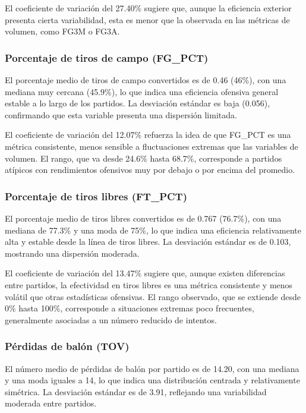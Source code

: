 \documentclass[12pt]{article}
\begin{document}
El coeficiente de variación del 27.40\% sugiere que, aunque la eficiencia exterior presenta cierta
variabilidad, esta es menor que la observada en las métricas de volumen, como FG3M o FG3A.

\subsubsection*{Porcentaje de tiros de campo (FG\_PCT)}

El porcentaje medio de tiros de campo convertidos es de 0.46 (46\%), con una mediana muy cercana
(45.9\%), lo que indica una eficiencia ofensiva general estable a lo largo de los partidos. La
desviación estándar es baja (0.056), confirmando que esta variable presenta una dispersión limitada.

El coeficiente de variación del 12.07\% refuerza la idea de que FG\_PCT es una métrica consistente,
menos sensible a fluctuaciones extremas que las variables de volumen. El rango, que va desde
24.6\% hasta 68.7\%, corresponde a partidos atípicos con rendimientos ofensivos muy por debajo o
por encima del promedio.

\subsubsection*{Porcentaje de tiros libres (FT\_PCT)}

El porcentaje medio de tiros libres convertidos es de 0.767 (76.7\%), con una mediana de 77.3\% y
una moda de 75\%, lo que indica una eficiencia relativamente alta y estable desde la línea de
tiros libres. La desviación estándar es de 0.103, mostrando una dispersión moderada.

El coeficiente de variación del 13.47\% sugiere que, aunque existen diferencias entre partidos,
la efectividad en tiros libres es una métrica consistente y menos volátil que otras estadísticas
ofensivas. El rango observado, que se extiende desde 0\% hasta 100\%, corresponde a situaciones
extremas poco frecuentes, generalmente asociadas a un número reducido de intentos.

\subsubsection*{Pérdidas de balón (TOV)}

El número medio de pérdidas de balón por partido es de 14.20, con una mediana y una moda iguales
a 14, lo que indica una distribución centrada y relativamente simétrica. La desviación estándar
es de 3.91, reflejando una variabilidad moderada entre partidos.
\end{document}
